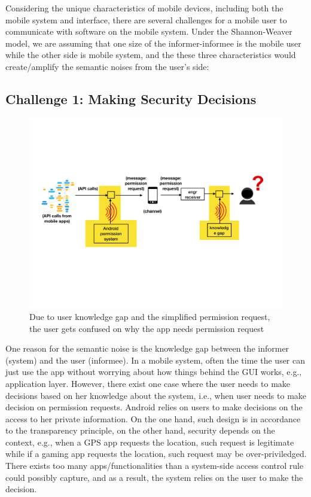 Considering the unique characteristics of mobile devices, including both the mobile system and interface, there are several challenges for a mobile user to communicate with software on the mobile system. Under the Shannon-Weaver model, we are assuming that one size of the informer-informee is the mobile user while the other side is mobile system, and the these three characteristics would create/amplify the semantic noises from the user's side:

\subsection{Challenge 1: Making Security Decisions}

\begin{figure}[h]
\centering
\includegraphics[width=.8\linewidth]{figure/chapter1/system_challenge}
\caption{Due to user knowledge gap and the simplified permission request, the user gets confused on why the app needs permission request\label{fig:ch1:system}}
\end{figure}

One reason for the semantic noise is the knowledge gap between the informer (system) and the user (informee). In a mobile system, often the time the user can just use the app without worrying about how things behind the GUI works, e.g., application layer. However, there exist one case where the user needs to make decisions based on her knowledge about the system, i.e., when user needs to make decision on permission requests. Android relies on users to make decisions on the access to her private information. On the one hand, such design is in accordance to the transparency principle, on the other hand, security depends on the context, e.g., when a GPS app requests the location, such request is legitimate while if a gaming app requests the location, such request may be over-priviledged. There exists too many apps/functionalities than a system-side access control rule could possibly capture, and as a result, the system relies on the user to make the decision. 

